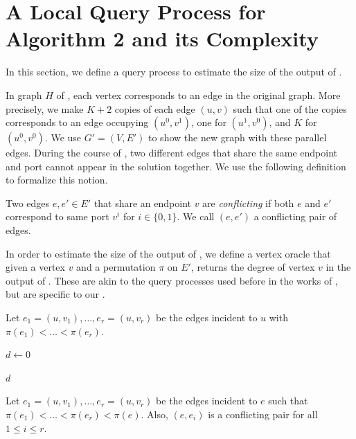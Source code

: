 \section{A Local Query Process for Algorithm 2 and its Complexity}\label{sec:query-process}

In this section, we define a query process to estimate the size of the output of \algtwo{}. 

In graph $H$ of \algtwo{}, each vertex corresponds to an edge in the original graph. More precisely, we make $K+2$ copies of each edge $(u, v)$ such that one of the copies corresponds to an edge occupying $(u^0, v^1)$, one for $(u^1, v^0)$, and $K$ for $(u^0, v^0)$. We use $G' = (V, E')$ to show the new graph with these parallel edges. During the course of \algtwo{}, two different edges that share the same endpoint and port cannot appear in the solution together. We use the following definition to formalize this notion.


\begin{definition}
Two edges $e, e' \in E'$ that share an endpoint $v$ are {\em conflicting} if both $e$ and $e'$ correspond to same port $v^i$ for $i \in \{0, 1\}$. We call $(e,e')$ a conflicting pair of edges.
\end{definition}

In order to estimate the size of the output of \algtwo{}, we define a vertex oracle that given a vertex $v$ and a permutation $\pi$ on $E'$, returns the degree of vertex $v$ in the output of \algtwo{}. These are akin to the query processes used before in the works of \cite{behnezhad2021,YoshidaYI09}, but are specific to our \algtwo{}.


\begin{algorithm}[H]
\caption{``vertex oracle'' $\VO(u, \pi)$ to determine the degree of vertex $u$ in $\RGMIS(G', \pi)$.}
\label{alg:vertexoracle}

	Let $e_1 = (u, v_1), \ldots, e_r = (u, v_r)$ be the edges incident to $u$ with $\pi(e_1) < \ldots < \pi(e_r)$.
	
	$d \leftarrow 0$
	
	\Return $d$
\end{algorithm}

\begin{algorithm}[H]
\caption{``edge oracle'' $\EO(e, u, \pi)$ to determine an edge $e$ is in $\RGMIS(G', \pi)$. Also, $u$ must be an endpoint of $e$.}
\label{alg:edgeoracle}

    
	Let $e_1 = (u, v_1), \ldots, e_r = (u, v_r)$ be the edges incident to $e$ such that $\pi(e_1) < \ldots < \pi(e_r) < \pi(e)$. Also, $(e, e_i)$ is a conflicting pair for all $1 \leq i \leq r$.
	
	
	\Return \true
\end{algorithm}


